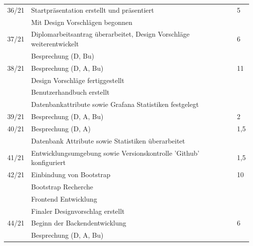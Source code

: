 \begin{table}[h]
\begin{tabular}{|l|l|l|}
		36/21   &Startpräsentation erstellt und präsentiert & 5 \\ 
		& Mit Design Vorschlägen begonnen &	\\ \hline
		37/21   &Diplomarbeitsantrag überarbeitet, Design Vorschläge weiterentwickelt& 6 \\ 
		& Besprechung (D, Bu) &	\\ \hline
			38/21   &Besprechung (D, A, Bu) & 11\\ 
		& Design Vorschläge fertiggestellt&	\\ 
			& Benutzerhandbuch erstellt&	\\
				&Datenbankattribute sowie Grafana Statistiken festgelegt&	\\   \hline
				39/21   &Besprechung (D, A, Bu)& 2\\  \hline
				40/21   &Besprechung (D, A)& 1,5 \\ 
				& Datenbank Attribute sowie Statistiken überarbeitet &	\\ \hline
				
				41/21   &Entwicklungsumgebung sowie Versionskontrolle 'Github' konfiguriert& 1,5\\  \hline
				
				42/21   &Einbindung von Bootstrap& 10 \\ 
				& Bootstrap Recherche &	\\
				& Frontend Entwicklung &	\\	 
					& Finaler Designvorschlag erstellt&	\\\hline
					
					
					
					44/21   &Beginn der Backendentwicklung& 6 \\ 
					& Besprechung (D, A, Bu) &	\\ \hline
				
				
		
		
		
		
		
		
	\end{tabular}
\end{table}

